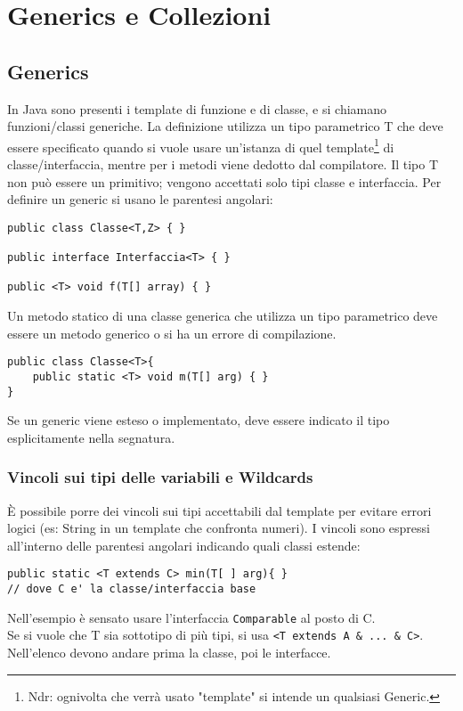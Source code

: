 \chapter{Generics e Collezioni}

\section{Generics}
In Java sono presenti i template di funzione e di classe, e si chiamano funzioni/classi generiche. La definizione utilizza un tipo parametrico T che deve essere specificato quando si vuole usare un'istanza di quel template\footnote{Ndr: ognivolta che verrà usato "template" si intende un qualsiasi Generic.} di classe/interfaccia, mentre per i metodi viene dedotto dal compilatore. Il tipo T non può essere un primitivo; vengono accettati solo tipi classe e interfaccia.
Per definire un generic si usano le parentesi angolari:
\begin{lstlisting}
public class Classe<T,Z> { }

public interface Interfaccia<T> { }

public <T> void f(T[] array) { }
\end{lstlisting}

Un metodo statico di una classe generica che utilizza un tipo parametrico deve essere un metodo generico o si ha un errore di compilazione. 
\begin{lstlisting}
public class Classe<T>{
	public static <T> void m(T[] arg) { }
}
\end{lstlisting}

Se un generic viene esteso o implementato, deve essere indicato il tipo esplicitamente nella segnatura.

\subsection{Vincoli sui tipi delle variabili e Wildcards}
È possibile porre dei vincoli sui tipi accettabili dal template per evitare errori logici (es: String in un template che confronta numeri). I vincoli sono espressi all'interno delle parentesi angolari indicando quali classi estende:

\begin{lstlisting}
public static <T extends C> min(T[ ] arg){ }
// dove C e' la classe/interfaccia base
\end{lstlisting}
Nell'esempio è sensato usare l'interfaccia \texttt{Comparable} al posto di C. \\
Se si vuole che T sia sottotipo di più tipi, si usa \texttt{<T extends A \& ... \& C>}. Nell'elenco devono andare prima la classe, poi le interfacce.


